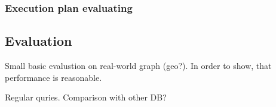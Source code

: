 \subsubsection{Execution plan evaluating}


\label{subsubsec:execution-plan-evaluating}

\subsection{Evaluation}

Small basic evalustion on real-world graph (geo?).
In order to show, that performance is reasonable.

Regular quries. Comparison with other DB?


